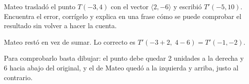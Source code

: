 \documentclass[11pt]{article}
\begin{document}
\begin{preguntas}
\pregunta[1] Mateo trasladó el punto $T(-3, 4)$ con el vector $\langle 2, -6 \rangle$ y
escribió $T'(-5, 10)$. Encuentra el error, corrígelo y explica en una frase cómo se puede
comprobar el resultado sin volver a hacer la cuenta.
\begin{solucion}[4cm]
Mateo restó en vez de sumar. Lo correcto es $T'(-3 + 2,\; 4 - 6) = T'(-1, -2)$.

Para comprobarlo basta dibujar: el punto debe quedar 2 unidades a la derecha y 6 hacia abajo del
original, y el de Mateo quedó a la izquierda y arriba, justo al contrario.
\end{solucion}

\end{preguntas}
\end{document}
